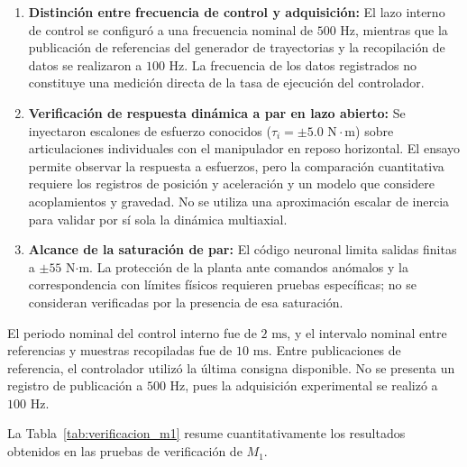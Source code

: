 \documentclass[12pt]{article}
\newcommand{\frecuenciacontrol}{500}
\newcommand{\frecuenciaregistro}{100}
\begin{document}
\begin{enumerate}
    \item \textbf{Distinción entre frecuencia de control y adquisición:} El lazo interno de control se configuró a una frecuencia nominal de $\frecuenciacontrol\text{ Hz}$, mientras que la publicación de referencias del generador de trayectorias y la recopilación de datos se realizaron a $\frecuenciaregistro\text{ Hz}$. La frecuencia de los datos registrados no constituye una medición directa de la tasa de ejecución del controlador.
    \item \textbf{Verificación de respuesta dinámica a par en lazo abierto:} Se inyectaron escalones de esfuerzo conocidos ($\tau_i = \pm 5.0\text{ N}\cdot\text{m}$) sobre articulaciones individuales con el manipulador en reposo horizontal. El ensayo permite observar la respuesta a esfuerzos, pero la comparación cuantitativa requiere los registros de posición y aceleración y un modelo que considere acoplamientos y gravedad. No se utiliza una aproximación escalar de inercia para validar por sí sola la dinámica multiaxial.
    \item \textbf{Alcance de la saturación de par:} El código neuronal limita salidas finitas a $\pm55$ N$\cdot$m. La protección de la planta ante comandos anómalos y la correspondencia con límites físicos requieren pruebas específicas; no se consideran verificadas por la presencia de esa saturación.
\end{enumerate}

El periodo nominal del control interno fue de $2\text{ ms}$, y el intervalo nominal entre referencias y muestras recopiladas fue de $10\text{ ms}$. Entre publicaciones de referencia, el controlador utilizó la última consigna disponible. No se presenta un registro de publicación a $500\text{ Hz}$, pues la adquisición experimental se realizó a $100\text{ Hz}$.

La Tabla~\ref{tab:verificacion_m1} resume cuantitativamente los resultados obtenidos en las pruebas de verificación de $M_1$.
\end{document}
